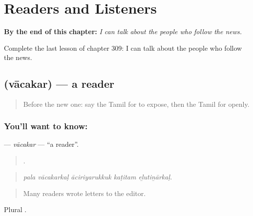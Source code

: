 
\chapter{Readers and Listeners}
\label{ch:ta-readers-and-listeners}

\begin{chapteropening}
\textbf{By the end of this chapter:} \emph{I can talk about the people who follow the news.}

Complete the last lesson of chapter 309: I can talk about the people who follow the news.
\end{chapteropening}

\section[\texorpdfstring{\ta{வாசகர்} (vācakar)}{வாசகர் (vācakar)}]{ (vācakar) — a reader}

\label{lesson:TA-C309-vacakar}



\begin{quote}
Before the new one: say the Tamil for to expose, then the Tamil for openly.
\end{quote}

\subsection*{You'll want to know: }
\textbf{} — \emph{vācakar} — \textquotedblleft{}a reader\textquotedblright{}.

\begin{quote}
    .
\end{quote}

\begin{quote}
\emph{pala vācakarkaḷ āciriyarukkuk kaṭitam eḻutiṉārkaḷ.}
\end{quote}

\begin{quote}
Many readers wrote letters to the editor.
\end{quote}

Plural .

